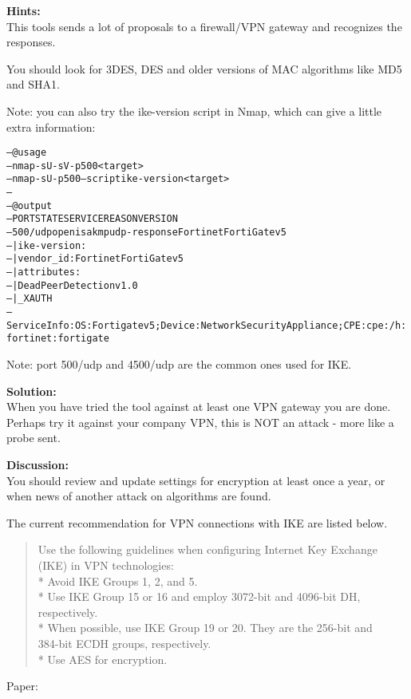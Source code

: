 \documentclass[a4paper,11pt,notitlepage]{report}
\begin{document}
{\bf Hints:}\\
This tools sends a lot of proposals to a firewall/VPN gateway and recognizes the responses.

You should look for 3DES, DES and older versions of MAC algorithms like MD5 and SHA1.

Note: you can also try the ike-version script in Nmap, which can give a little extra information:
\begin{alltt}
-- @usage
-- nmap -sU -sV -p 500 <target>
-- nmap -sU -p 500 --script ike-version <target>
--
-- @output
-- PORT    STATE SERVICE REASON       VERSION
-- 500/udp open  isakmp  udp-response Fortinet FortiGate v5
-- | ike-version:
-- |   vendor_id: Fortinet FortiGate v5
-- |   attributes:
-- |     Dead Peer Detection v1.0
-- |_    XAUTH
-- Service Info: OS: Fortigate v5; Device: Network Security Appliance; CPE: cpe:/h:fortinet:fortigate
\end{alltt}

Note: port 500/udp and 4500/udp are the common ones used for IKE.

{\bf Solution:}\\
When you have tried the tool against at least one VPN gateway you are done. Perhaps try it against your company VPN, this is NOT an attack - more like a probe sent.

{\bf Discussion:}\\
You should review and update settings for encryption at least once a year, or when news of another attack on algorithms are found.

The current recommendation for VPN connections with IKE are listed below.

\begin{quote}
  Use the following guidelines when configuring Internet Key Exchange (IKE) in VPN technologies:\\
* Avoid IKE Groups 1, 2, and 5.\\
* Use IKE Group 15 or 16 and employ 3072-bit and 4096-bit DH, respectively.\\
* When possible, use IKE Group 19 or 20. They are the 256-bit and \\
384-bit ECDH groups, respectively.\\
* Use AES for encryption.
\end{quote}
Paper:\\
{\small {}}
\end{document}
